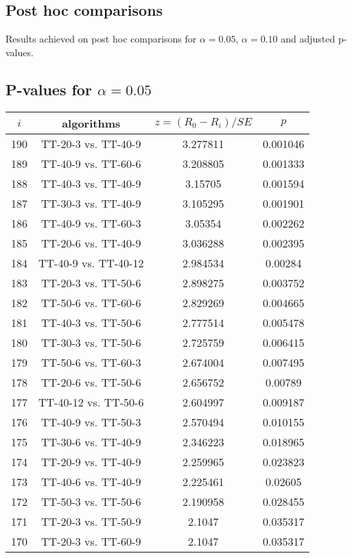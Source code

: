 \documentclass[a4paper,10pt]{article}
\begin{document}
\begin{landscape}
\pagebreak

\section{Post hoc comparisons}

Results achieved on post hoc comparisons for $\alpha = 0.05$, $\alpha = 0.10$ and adjusted p-values.

\subsection{P-values for $\alpha=0.05$}

\begin{table}[!htp]
\centering\scriptsize
\begin{tabular}{cccc}
$i$&algorithms&$z=(R_0 - R_i)/SE$&$p$\\
\hline190&TT-20-3 vs. TT-40-9&3.277811&0.001046\\
189&TT-40-9 vs. TT-60-6&3.208805&0.001333\\
188&TT-40-3 vs. TT-40-9&3.15705&0.001594\\
187&TT-30-3 vs. TT-40-9&3.105295&0.001901\\
186&TT-40-9 vs. TT-60-3&3.05354&0.002262\\
185&TT-20-6 vs. TT-40-9&3.036288&0.002395\\
184&TT-40-9 vs. TT-40-12&2.984534&0.00284\\
183&TT-20-3 vs. TT-50-6&2.898275&0.003752\\
182&TT-50-6 vs. TT-60-6&2.829269&0.004665\\
181&TT-40-3 vs. TT-50-6&2.777514&0.005478\\
180&TT-30-3 vs. TT-50-6&2.725759&0.006415\\
179&TT-50-6 vs. TT-60-3&2.674004&0.007495\\
178&TT-20-6 vs. TT-50-6&2.656752&0.00789\\
177&TT-40-12 vs. TT-50-6&2.604997&0.009187\\
176&TT-40-9 vs. TT-50-3&2.570494&0.010155\\
175&TT-30-6 vs. TT-40-9&2.346223&0.018965\\
174&TT-20-9 vs. TT-40-9&2.259965&0.023823\\
173&TT-40-6 vs. TT-40-9&2.225461&0.02605\\
172&TT-50-3 vs. TT-50-6&2.190958&0.028455\\
171&TT-20-3 vs. TT-50-9&2.1047&0.035317\\
170&TT-20-3 vs. TT-60-9&2.1047&0.035317\\

\end{tabular}
\end{table}
\end{landscape}
\end{document}
